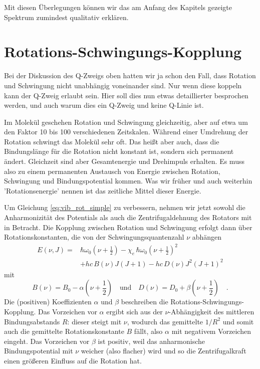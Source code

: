 Mit diesen Überlegungen können wir das am Anfang des Kapitels gezeigte Spektrum zumindest qualitativ erklären.


\begin{marginfigure}
\caption{Rotations-Vibrations-Übergänge liefert die P, Q, R-Zweige im Spektrum.}
\end{marginfigure}
 
 
\section{Rotations-Schwingungs-Kopplung}

Bei der Diskussion des Q-Zweigs oben hatten wir ja schon den Fall, dass Rotation und Schwingung nicht unabhängig voneinander sind. Nur wenn diese koppeln kann der Q-Zweig erlaubt sein. Hier soll dies nun etwas detaillierter besprochen werden, und auch warum dies ein Q-Zweig und keine Q-Linie ist.

Im Molekül geschehen Rotation und Schwingung gleichzeitig, aber auf etwa um den Faktor 10 bis 100 verschiedenen Zeitskalen. Während einer Umdrehung der Rotation schwingt  das Molekül sehr oft. Das heißt aber auch, dass die Bindungslänge für die Rotation nicht konstant ist, sondern sich permanent ändert. Gleichzeit sind aber Gesamtenergie und Drehimpuls erhalten. Es muss also zu einem permanenten Austausch von Energie zwischen Rotation, Schwingung und Bindungspotential kommen. Was wir früher und auch weiterhin 'Rotationsenergie' nennen ist das zeitliche Mittel dieser Energie.

Um Gleichung \ref{eq:vib_rot_simple} zu verbessern, nehmen wir jetzt sowohl die Anharmonizität des Potentials als auch die Zentrifugaldehnung des Rotators mit in Betracht. Die Kopplung zwischen Rotation und Schwingung erfolgt dann über Rotationskonstanten, die von der Schwingungsquantenzahl $\nu$ abhängen
\begin{align}
 E(\nu, J) = & \hbar \omega_0 \left( \nu  + \frac{1}{2} \right)
 - \chi_e \, \hbar \omega_0  \left( \nu  + \frac{1}{2} \right)^2 \\
 & + h c \, B(\nu) J (J+1) - h c \, D(\nu) J^2 (J+1)^2  \nonumber
\end{align}
mit
\begin{equation}
B(\nu) = B_0 - \alpha \left(\nu + \frac{1}{2} \right) \quad \text{und} \quad
D(\nu) = D_0 + \beta \left(\nu + \frac{1}{2} \right)  \quad .
\end{equation}
Die (positiven) Koeffizienten $\alpha$ und $\beta$ beschreiben die  Rotations-Schwingungs-Kopplung. Das Vorzeichen vor $\alpha$ ergibt sich aus der $\nu$-Abhängigkeit des mittleren Bindungsabstands $R$: dieser steigt mit $\nu$, wodurch das gemittelte $1/R^2$ und somit auch die gemittelte Rotationskonstante $B$ fällt, also $\alpha$ mit negativem Vorzeichen eingeht. Das Vorzeichen vor $\beta$ ist positiv, weil das anharmonische Bindungspotential mit $\nu$ weicher (also flacher) wird und so die Zentrifugalkraft einen größeren Einfluss auf die Rotation hat.

